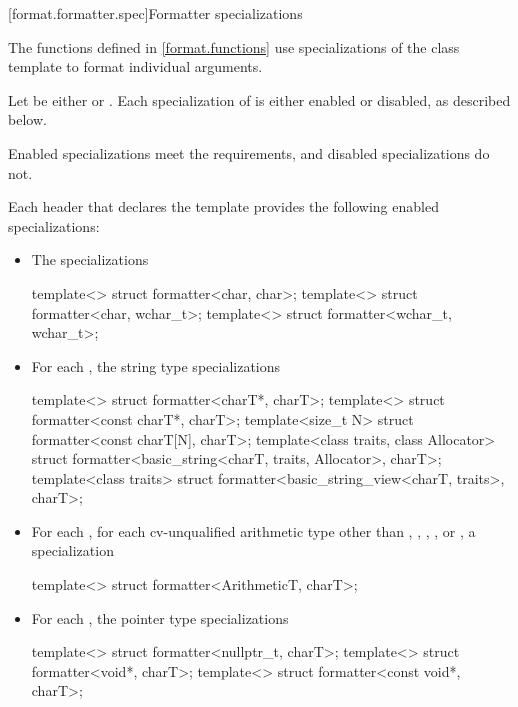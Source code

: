 [format.formatter.spec]{Formatter specializations}
%

\pnum
The functions defined in \ref{format.functions} use
specializations of the class template  to format
individual arguments.

\pnum
Let  be either  or .
Each specialization of  is either enabled or disabled,
as described below.
\begin{note}
Enabled specializations meet the  requirements,
and disabled specializations do not.
\end{note}
Each header that declares the template 
provides the following enabled specializations:
\begin{itemize}
\item
{}%
The specializations
\begin{codeblock}
template<> struct formatter<char, char>;
template<> struct formatter<char, wchar_t>;
template<> struct formatter<wchar_t, wchar_t>;
\end{codeblock}

\item
{}%
For each ,
the string type specializations
\begin{codeblock}
template<> struct formatter<charT*, charT>;
template<> struct formatter<const charT*, charT>;
template<size_t N> struct formatter<const charT[N], charT>;
template<class traits, class Allocator>
  struct formatter<basic_string<charT, traits, Allocator>, charT>;
template<class traits>
  struct formatter<basic_string_view<charT, traits>, charT>;
\end{codeblock}

\item
{}%
For each ,
for each cv-unqualified arithmetic type 
other than
,
,
,
, or
,
a specialization
\begin{codeblock}
template<> struct formatter<ArithmeticT, charT>;
\end{codeblock}

\item
{}%
%
For each ,
the pointer type specializations
\begin{codeblock}
template<> struct formatter<nullptr_t, charT>;
template<> struct formatter<void*, charT>;
template<> struct formatter<const void*, charT>;
\end{codeblock}
\end{itemize}
